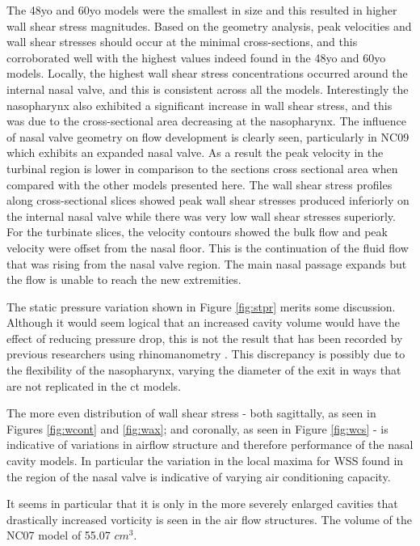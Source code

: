 The 48yo and 60yo models were the smallest in size and this resulted in higher wall shear stress magnitudes. Based on the geometry analysis, peak velocities and wall shear stresses should occur at the minimal cross-sections, and this corroborated well with the highest values indeed found in the 48yo and 60yo models. Locally, the highest wall shear stress concentrations occurred around the internal nasal valve, and this is consistent across all the models. Interestingly the nasopharynx also exhibited a significant increase in wall shear stress, and this was due to the cross-sectional area decreasing at the nasopharynx.
The influence of nasal valve geometry on flow development is clearly seen, particularly in NC09 which exhibits an expanded nasal valve. As a result the peak velocity in the turbinal region is lower in comparison to the sections cross sectional area when compared with the other models presented here.
The wall shear stress profiles along cross-sectional slices showed peak wall shear stresses produced inferiorly on the internal nasal valve while there was very low wall shear stresses superiorly. For the turbinate slices, the velocity contours showed the bulk flow and peak velocity were offset from the nasal floor. This is the continuation of the fluid flow that was rising from the nasal valve region. The main nasal passage expands but the flow is unable to reach the new extremities.

The static pressure variation shown in Figure \ref{fig:stpr} merits some discussion. Although it would seem logical that an increased cavity volume would have the effect of reducing pressure drop, this is not the result that has been recorded by previous researchers using rhinomanometry \cite{Lindemann2008}. This discrepancy is possibly due to the flexibility of the nasopharynx, varying the diameter of the exit in ways that are not replicated in the ct models.

The more even distribution of wall shear stress - both sagittally, as seen in Figures \ref{fig:wcont} and \ref{fig:wax}; and coronally, as seen in Figure \ref{fig:wcs} - is indicative of variations in airflow structure and therefore performance of the nasal cavity models. In particular the variation in the local maxima for WSS found in the region of the nasal valve is indicative of varying air conditioning capacity.

It seems in particular that it is only in the more severely enlarged cavities that drastically increased vorticity is seen in the air flow structures. The volume of the NC07 model of 55.07 $cm^3$.

